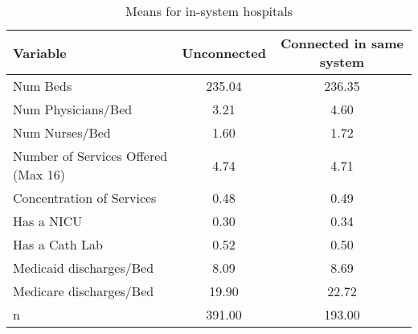 \begin{table}[ht!]
\centering
\caption{Means for in-system hospitals}
\centering
\begin{tabular}[t]{lcc}
\toprule
Variable & Unconnected & Connected in same system\\
\midrule
Num Beds & 235.04 & 236.35\\
Num Physicians/Bed & 3.21 & 4.60\\
Num Nurses/Bed & 1.60 & 1.72\\
Number of Services Offered (Max 16) & 4.74 & 4.71\\
Concentration of Services & 0.48 & 0.49\\
\addlinespace
Has a NICU & 0.30 & 0.34\\
Has a Cath Lab & 0.52 & 0.50\\
Medicaid discharges/Bed & 8.09 & 8.69\\
Medicare discharges/Bed & 19.90 & 22.72\\
n & 391.00 & 193.00\\
\bottomrule
\end{tabular}
\end{table}
